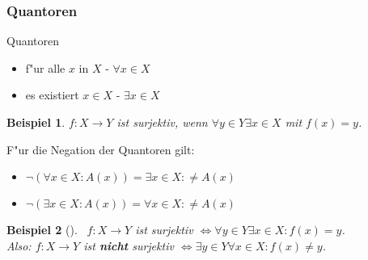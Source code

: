 \documentclass[11pt]{article}
\newtheorem{exa}{Beispiel}[section]
\begin{document}
\subsubsection{Quantoren}
\label{sec:orgd2b2557}
\begin{definition}{Quantoren}{}
\begin{itemize}
\item f"ur alle \(x\) in \(X\) - \(\forall x \in X\)
\item es existiert \(x \in X\) - \(\exists x \in X\)
\end{itemize}
\end{definition}

\begin{exa}
\(f:X\to Y\) ist surjektiv, wenn \(\forall y \in Y \exists x\in X\) mit \(f(x)=y\).
\end{exa}

F"ur die Negation der Quantoren gilt:
\begin{relation}
\begin{itemize}
\item \(\neg(\forall x\in X : A(x)) = \exists x\in X : \neq A(x)\)
\item \(\neg(\exists x\in X : A(x)) = \forall x\in X : \neq A(x)\)
\end{itemize}
\end{relation}

\begin{exa}[] \label{} \
\(f: X\to Y\) ist surjektiv \(\iff \forall y\in Y \exists x\in X : f(x)=y\).\\
Also: \(f: X\to Y\) ist \textbf{nicht} surjektiv \(\iff \exists y\in Y \forall x\in X : f(x)\not=y\).
\end{exa}
\end{document}
